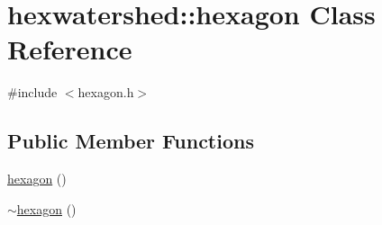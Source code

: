 \hypertarget{classhexwatershed_1_1hexagon}{\section{hexwatershed\-:\-:hexagon Class Reference}
\label{classhexwatershed_1_1hexagon}
}


{\ttfamily \#include $<$hexagon.\-h$>$}

\subsection*{Public Member Functions}
\begin{DoxyCompactItemize}
\item 
\hyperlink{classhexwatershed_1_1hexagon_aafc6d7af807d954ae1091d2f08e886f8}{hexagon} ()
\item 
\hyperlink{classhexwatershed_1_1hexagon_a5038c0cabf6146fac9e859ea0ad75210}{$\sim$hexagon} ()
\end{DoxyCompactItemize}
